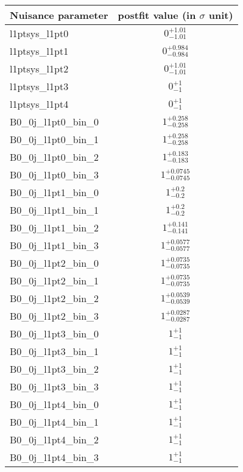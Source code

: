 
\begin{tabular}{|l|c|}
\hline
Nuisance parameter & postfit value (in $\sigma$ unit) \\\hline
l1ptsys\_l1pt0 & $0^{+1.01}_{-1.01}$ \\
l1ptsys\_l1pt1 & $0^{+0.984}_{-0.984}$ \\
l1ptsys\_l1pt2 & $0^{+1.01}_{-1.01}$ \\
l1ptsys\_l1pt3 & $0^{+1}_{-1}$ \\
l1ptsys\_l1pt4 & $0^{+1}_{-1}$ \\
B0\_0j\_l1pt0\_bin\_0 & $1^{+0.258}_{-0.258}$ \\
B0\_0j\_l1pt0\_bin\_1 & $1^{+0.258}_{-0.258}$ \\
B0\_0j\_l1pt0\_bin\_2 & $1^{+0.183}_{-0.183}$ \\
B0\_0j\_l1pt0\_bin\_3 & $1^{+0.0745}_{-0.0745}$ \\
B0\_0j\_l1pt1\_bin\_0 & $1^{+0.2}_{-0.2}$ \\
B0\_0j\_l1pt1\_bin\_1 & $1^{+0.2}_{-0.2}$ \\
B0\_0j\_l1pt1\_bin\_2 & $1^{+0.141}_{-0.141}$ \\
B0\_0j\_l1pt1\_bin\_3 & $1^{+0.0577}_{-0.0577}$ \\
B0\_0j\_l1pt2\_bin\_0 & $1^{+0.0735}_{-0.0735}$ \\
B0\_0j\_l1pt2\_bin\_1 & $1^{+0.0735}_{-0.0735}$ \\
B0\_0j\_l1pt2\_bin\_2 & $1^{+0.0539}_{-0.0539}$ \\
B0\_0j\_l1pt2\_bin\_3 & $1^{+0.0287}_{-0.0287}$ \\
B0\_0j\_l1pt3\_bin\_0 & $1^{+1}_{-1}$ \\
B0\_0j\_l1pt3\_bin\_1 & $1^{+1}_{-1}$ \\
B0\_0j\_l1pt3\_bin\_2 & $1^{+1}_{-1}$ \\
B0\_0j\_l1pt3\_bin\_3 & $1^{+1}_{-1}$ \\
B0\_0j\_l1pt4\_bin\_0 & $1^{+1}_{-1}$ \\
B0\_0j\_l1pt4\_bin\_1 & $1^{+1}_{-1}$ \\
B0\_0j\_l1pt4\_bin\_2 & $1^{+1}_{-1}$ \\
B0\_0j\_l1pt4\_bin\_3 & $1^{+1}_{-1}$ \\
\hline
\end{tabular}
